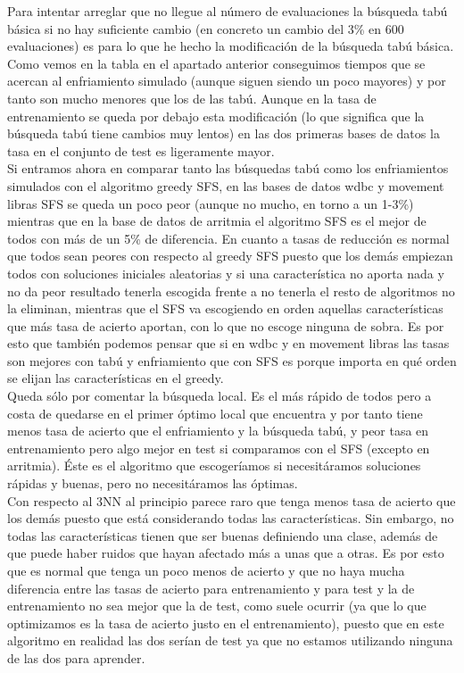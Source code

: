 \documentclass[12pt]{article}
\begin{document}
Para intentar arreglar que no llegue al número de evaluaciones la búsqueda tabú básica si no hay suficiente cambio (en concreto un cambio del 3\% en 600 evaluaciones) es para lo que he hecho la modificación de la búsqueda tabú básica. Como vemos en la tabla en el apartado anterior conseguimos tiempos que se acercan al enfriamiento simulado (aunque siguen siendo un poco mayores) y por tanto son mucho menores que los de las tabú. Aunque en la tasa de entrenamiento se queda por debajo esta modificación (lo que significa que la búsqueda tabú tiene cambios muy lentos) en las dos primeras bases de datos la tasa en el conjunto de test es ligeramente mayor.\\

Si entramos ahora en comparar tanto las búsquedas tabú como los enfriamientos simulados con el algoritmo greedy SFS, en las bases de datos wdbc y movement libras SFS se queda un poco peor (aunque no mucho, en torno a un 1-3\%) mientras que en la base de datos de arritmia el algoritmo SFS es el mejor de todos con más de un 5\% de diferencia. En cuanto a tasas de reducción es normal que todos sean peores con respecto al greedy SFS puesto que los demás empiezan todos con soluciones iniciales aleatorias y si una característica no aporta nada y no da peor resultado tenerla escogida frente a no tenerla el resto de algoritmos no la eliminan, mientras que el SFS va escogiendo en orden aquellas características que más tasa de acierto aportan, con lo que no escoge ninguna de sobra. Es por esto que también podemos pensar que si en wdbc y en movement libras las tasas son mejores con tabú y enfriamiento que con SFS es porque importa en qué orden se elijan las características en el greedy.\\

Queda sólo por comentar la búsqueda local. Es el más rápido de todos pero a costa de quedarse en el primer óptimo local que encuentra y por tanto tiene menos tasa de acierto que el enfriamiento y la búsqueda tabú, y peor tasa en entrenamiento pero algo mejor en test si comparamos con el SFS (excepto en arritmia). Éste es el algoritmo que escogeríamos si necesitáramos soluciones rápidas y buenas, pero no necesitáramos las óptimas.\\

Con respecto al 3NN al principio parece raro que tenga menos tasa de acierto que los demás puesto que está considerando todas las características. Sin embargo, no todas las características tienen que ser buenas definiendo una clase, además de que puede haber ruidos que hayan afectado más a unas que a otras. Es por esto que es normal que tenga un poco menos de acierto y que no haya mucha diferencia entre las tasas de acierto para entrenamiento y para test y la de entrenamiento no sea mejor que la de test, como suele ocurrir (ya que lo que optimizamos es la tasa de acierto justo en el entrenamiento), puesto que en este algoritmo en realidad las dos serían de test ya que no estamos utilizando ninguna de las dos para aprender.\\
\end{document}
